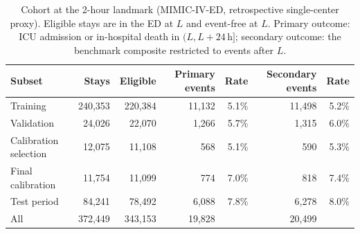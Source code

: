 \begin{table}[t]
\centering
\caption{Cohort at the 2-hour landmark (MIMIC-IV-ED, retrospective single-center proxy). Eligible stays are in the ED at $L$ and event-free at $L$. Primary outcome: ICU admission or in-hospital death in $(L, L+24\,\mathrm{h}]$; secondary outcome: the benchmark composite restricted to events after $L$.}
\label{tab:cohort}
\begin{tabular}{lrrrrrr}
\toprule
Subset & Stays & Eligible & Primary events & Rate & Secondary events & Rate \\
\midrule
Training & 240,353 & 220,384 & 11,132 & 5.1\% & 11,498 & 5.2\% \\
Validation & 24,026 & 22,070 & 1,266 & 5.7\% & 1,315 & 6.0\% \\
Calibration selection & 12,075 & 11,108 & 568 & 5.1\% & 590 & 5.3\% \\
Final calibration & 11,754 & 11,099 & 774 & 7.0\% & 818 & 7.4\% \\
Test period & 84,241 & 78,492 & 6,088 & 7.8\% & 6,278 & 8.0\% \\
\midrule
All & 372,449 & 343,153 & 19,828 &  & 20,499 &  \\
\bottomrule
\end{tabular}
\end{table}
